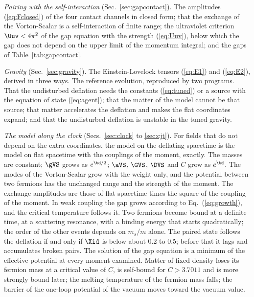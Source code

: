 \emph{Pairing with the self-interaction} (Sec.~\ref{sec:gapcontact}). The amplitudes
(\ref{eq:Fclosed}) of the four contact channels in closed form; that the exchange of the
Vorton-Scalar is a self-interaction of finite range; the ultraviolet criterion $\Uuv<4\pi^{2}$ of
the gap equation with the strength (\ref{eq:Uuv}), below which the gap does not depend on the upper
limit of the momentum integral; and the gaps of Table~\ref{tab:gapcontact}.

\emph{Gravity} (Sec.~\ref{sec:gravity}). The Einstein-Lovelock tensors (\ref{eq:E1}) and
(\ref{eq:E2}), derived in three ways. The reference evolution, reproduced by two programs. That the
undisturbed deflation needs the constants (\ref{eq:tuned}) or a source with the equation of state
(\ref{eq:agent}); that the matter of the model cannot be that source; that matter accelerates the
deflation and makes the flat coordinates expand; and that the undisturbed deflation is unstable in
the tuned gravity.

\emph{The model along the clock} (Secs.~\ref{sec:clock} to \ref{sec:cjt}). For fields that do not
depend on the extra coordinates, the model on the deflating spacetime is the model on flat spacetime
with the couplings of the moment, exactly. The masses are constant; $\gVS$ grows as
$e^{\td/2}$; $\aVS$, $\GVS$, $\DVS$ and $C$ grow as $e^{\td}$. The modes of the Vorton-Scalar grow
with the weight only, and the potential between two fermions has the unchanged range and the
strength of the moment. The exchange amplitudes are those of flat spacetime times the square of the
coupling of the moment. In weak coupling the gap grows according to Eq.~(\ref{eq:growth}), and the
critical temperature follows it. Two fermions become bound at a definite time, at a scattering
resonance, with a binding energy that starts quadratically; the order of the other events depends on
$m_s/m$ alone. The paired state follows the deflation if and only if $\Xid$ is below about 0.2 to
0.5; before that it lags and accumulates broken pairs. The solution of the gap equation is a minimum
of the effective potential at every moment examined. Matter of fixed density loses its fermion mass
at a critical value of $C$, is self-bound for $C>3.7011$ and is more strongly bound later; the
melting temperature of the fermion mass falls; the barrier of the one-loop potential of the vacuum
moves toward the vacuum value.

